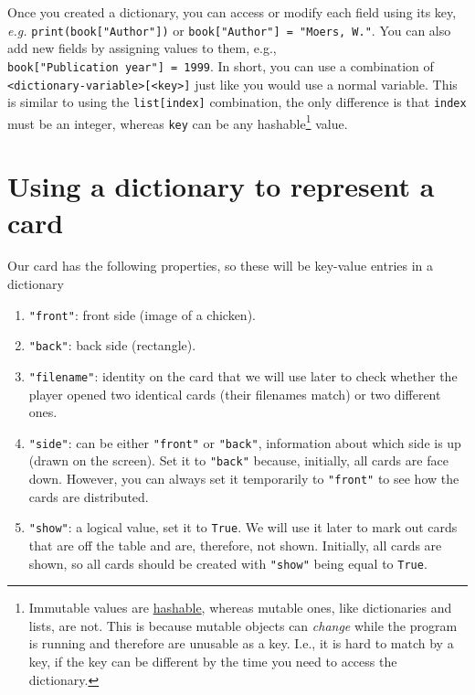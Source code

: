\documentclass[
]{book}
\providecommand{\tightlist}{%
  \setlength{\itemsep}{0pt}\setlength{\parskip}{0pt}}
\begin{document}
Once you created a dictionary, you can access or modify each field using its key, \emph{e.g.} \texttt{print(book{[}"Author"{]})} or \texttt{book{[}"Author"{]}\ =\ "Moers,\ W."}. You can also add new fields by assigning values to them, e.g., \texttt{book{[}"Publication\ year"{]}\ =\ 1999}. In short, you can use a combination of \texttt{\textless{}dictionary-variable\textgreater{}{[}\textless{}key\textgreater{}{]}} just like you would use a normal variable. This is similar to using the \texttt{list{[}index{]}} combination, the only difference is that \texttt{index} must be an integer, whereas \texttt{key} can be any hashable\footnote{Immutable values are \href{https://docs.python.org/3/glossary.html\#term-hashable}{hashable}, whereas mutable ones, like dictionaries and lists, are not. This is because mutable objects can \emph{change} while the program is running and therefore are unusable as a key. I.e., it is hard to match by a key, if the key can be different by the time you need to access the dictionary.} value.

\hypertarget{using-a-dictionary-to-represent-a-card}{%
\section{Using a dictionary to represent a card}\label{using-a-dictionary-to-represent-a-card}}

Our card has the following properties, so these will be key-value entries in a dictionary

\begin{enumerate}
\def\labelenumi{\arabic{enumi}.}
\tightlist
\item
  \texttt{"front"}: front side (image of a chicken).
\item
  \texttt{"back"}: back side (rectangle).
\item
  \texttt{"filename"}: identity on the card that we will use later to check whether the player opened two identical cards (their filenames match) or two different ones.
\item
  \texttt{"side"}: can be either \texttt{"front"} or \texttt{"back"}, information about which side is up (drawn on the screen). Set it to \texttt{"back"} because, initially, all cards are face down. However, you can always set it temporarily to \texttt{"front"} to see how the cards are distributed.
\item
  \texttt{"show"}: a logical value, set it to \texttt{True}. We will use it later to mark out cards that are off the table and are, therefore, not shown. Initially, all cards are shown, so all cards should be created with \texttt{"show"} being equal to \texttt{True}.
\end{enumerate}
\end{document}

